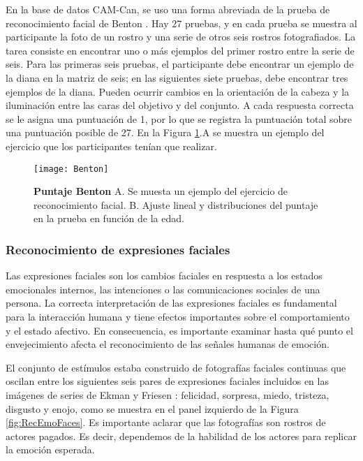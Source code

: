 \documentclass[11pt,letterpaper]{article}
\numberwithin{equation}{subsection}
\numberwithin{table}{subsection}
\begin{document}
\bigskip
\noindent En la base de datos CAM-Can, se uso una forma abreviada de la prueba de reconocimiento facial de Benton \cite{levin1975short}. Hay 27 pruebas, y en cada prueba se muestra al participante la foto de un rostro y una serie de otros seis rostros fotografiados. La tarea consiste en encontrar uno o más ejemplos del primer rostro entre la serie de seis. Para las primeras seis pruebas, el participante debe encontrar un ejemplo de la diana en la matriz de seis; en las siguientes siete pruebas, debe encontrar tres ejemplos de la diana. Pueden ocurrir cambios en la orientación de la cabeza y la iluminación entre las caras del objetivo y del conjunto. A cada respuesta correcta se le asigna una puntuación de 1, por lo que se registra la puntuación total sobre una puntuación posible de 27. En la Figura \ref{fig:Benton}.A se muestra un ejemplo del ejercicio que los participantes tenían que realizar.


\begin{figure}[H]
\centering
	\texttt{[image: Benton]}
	\captionsetup{labelfont=bf}
	\caption{\scriptsize \textbf{Puntaje Benton} A. Se muesta un ejemplo del ejercicio de reconocimiento facial. B. Ajuste lineal y distribuciones del puntaje en la prueba en función de la edad.}
	\label{fig:Benton}
\end{figure}

\subsubsection{Reconocimiento de expresiones faciales}

\smallskip
\noindent Las expresiones faciales son los cambios faciales en respuesta a los estados emocionales internos, las intenciones o las comunicaciones sociales de una persona. La correcta interpretación de las expresiones faciales es fundamental para la interacción humana y tiene efectos importantes sobre el comportamiento y el estado afectivo. En consecuencia, es importante examinar hasta qué punto el envejecimiento afecta el reconocimiento de las señales humanas de emoción.

\bigskip
\noindent El conjunto de estímulos estaba construido de fotografías faciales continuas que oscilan entre los siguientes seis pares de expresiones faciales incluidos en las imágenes de series de Ekman y Friesen \cite{ekman1976pictures}: felicidad, sorpresa, miedo, tristeza, disgusto y enojo, como se muestra en el panel izquierdo de la Figura \ref{fig:RecEmoFaces}. Es importante aclarar que las fotografías son rostros de actores pagados. Es decir, dependemos de la habilidad de los actores para replicar la emoción esperada.
\end{document}
